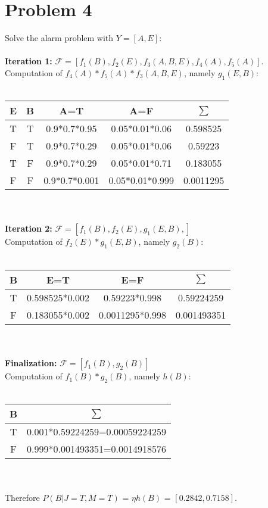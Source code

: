\documentclass{article}
\begin{document}
\section{Problem 4}

Solve the alarm problem with $Y=[A,E]$: \\ \\

{\bf Iteration 1:} $\mathcal{F}=[f_1(B),f_2(E),f_3(A,B,E),f_4(A),f_5(A)]$.\\
Computation of $f_4(A)*f_5(A)*f_3(A,B,E)$, namely $g_1(E,B)$:\\ \\

\begin{tabular}{| c | c | c | c | c |}
\hline
{\bf E} & {\bf B } & {\bf A=T} & {\bf A=F} & {\bf $\sum$}\\
\hline
T & T & 0.9*0.7*0.95 & 0.05*0.01*0.06 & 0.598525 \\
\hline
F & T & 0.9*0.7*0.29 & 0.05*0.01*0.06 & 0.59223 \\
\hline
T & F & 0.9*0.7*0.29 & 0.05*0.01*0.71 & 0.183055 \\
\hline
F & F & 0.9*0.7*0.001 & 0.05*0.01*0.999 & 0.0011295 \\
\hline
\end{tabular}
\\ \\
{\bf Iteration 2:} $\mathcal{F}=[f_1(B),f_2(E),g_1(E,B),]$\\
Computation of $f_2(E)*g_1(E,B)$, namely $g_2(B)$: \\ \\

\begin{tabular}{|c|c|c|c|}
\hline
{\bf B} & {\bf E=T} & {\bf E=F} & {\bf $\sum$} \\
\hline
T & 0.598525*0.002 & 0.59223*0.998 & 0.59224259 \\
\hline
F & 0.183055*0.002 & 0.0011295*0.998 & 0.001493351 \\
\hline
\end{tabular}
\\ \\
{\bf Finalization:} $\mathcal{F}=[f_1(B),g_2(B)]$ \\
Computation of $f_1(B)*g_2(B)$, namely $h(B)$: \\ \\

\begin{tabular}{|c|c|}
\hline
{\bf B} & {\bf $\sum$} \\
\hline
T & 0.001*0.59224259=0.00059224259 \\
\hline
F & 0.999*0.001493351=0.0014918576 \\
\hline
\end{tabular}
\\ \\
Therefore $P(B|J=T,M=T)$ = $\eta h(B)$ = $[0.2842,0.7158]$.
\end{document}
